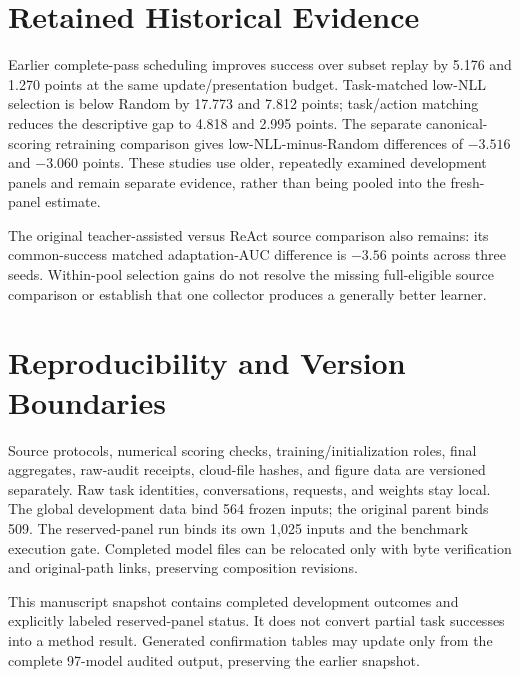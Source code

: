 \documentclass{article}
\begin{document}
\section{Retained Historical Evidence}
Earlier complete-pass scheduling improves success over subset replay by 5.176 and 1.270 points at the same update/presentation budget. Task-matched low-NLL selection is below Random by 17.773 and 7.812 points; task/action matching reduces the descriptive gap to 4.818 and 2.995 points. The separate canonical-scoring retraining comparison gives low-NLL-minus-Random differences of $-3.516$ and $-3.060$ points. These studies use older, repeatedly examined development panels and remain separate evidence, rather than being pooled into the fresh-panel estimate.

The original teacher-assisted versus ReAct source comparison also remains: its common-success matched adaptation-AUC difference is $-3.56$ points across three seeds. Within-pool selection gains do not resolve the missing full-eligible source comparison or establish that one collector produces a generally better learner.

\section{Reproducibility and Version Boundaries}
Source protocols, numerical scoring checks, training/initialization roles, final aggregates, raw-audit receipts, cloud-file hashes, and figure data are versioned separately. Raw task identities, conversations, requests, and weights stay local. The global development data bind 564 frozen inputs; the original parent binds 509. The reserved-panel run binds its own 1,025 inputs and the benchmark execution gate. Completed model files can be relocated only with byte verification and original-path links, preserving composition revisions.

This manuscript snapshot contains completed development outcomes and explicitly labeled reserved-panel status. It does not convert partial task successes into a method result. Generated confirmation tables may update only from the complete 97-model audited output, preserving the earlier snapshot.

\clearpage

\clearpage

\clearpage

\end{document}
